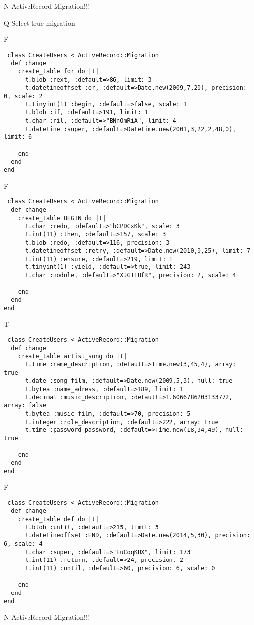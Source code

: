 N
ActiveRecord Migration!!!
  
Q
Select true migration

F
\begin{verbatim}
 class CreateUsers < ActiveRecord::Migration 
  def change 
    create_table for do |t| 
      t.blob :next, :default=>86, limit: 3
      t.datetimeoffset :or, :default=>Date.new(2009,7,20), precision: 0, scale: 2
      t.tinyint(1) :begin, :default=>false, scale: 1
      t.blob :if, :default=>191, limit: 1
      t.char :nil, :default=>"BNnOmRiA", limit: 4
      t.datetime :super, :default=>DateTime.new(2001,3,22,2,48,0), limit: 6
   
    end 
  end 
end
\end{verbatim}

F
\begin{verbatim}
 class CreateUsers < ActiveRecord::Migration 
  def change 
    create_table BEGIN do |t| 
      t.char :redo, :default=>"bCPDCxKk", scale: 3
      t.int(11) :then, :default=>157, scale: 3
      t.blob :redo, :default=>116, precision: 3
      t.datetimeoffset :retry, :default=>Date.new(2010,0,25), limit: 7
      t.int(11) :ensure, :default=>219, limit: 1
      t.tinyint(1) :yield, :default=>true, limit: 243
      t.char :module, :default=>"XJGTIUfR", precision: 2, scale: 4
   
    end 
  end 
end
\end{verbatim}

T
\begin{verbatim}
 class CreateUsers < ActiveRecord::Migration 
  def change 
    create_table artist_song do |t| 
      t.time :name_description, :default=>Time.new(3,45,4), array: true
      t.date :song_film, :default=>Date.new(2009,5,3), null: true
      t.bytea :name_adress, :default=>189, limit: 1
      t.decimal :music_description, :default=>1.6066786203133772, array: false
      t.bytea :music_film, :default=>70, precision: 5
      t.integer :role_description, :default=>222, array: true
      t.time :password_password, :default=>Time.new(18,34,49), null: true
   
    end 
  end 
end
\end{verbatim}

F
\begin{verbatim}
 class CreateUsers < ActiveRecord::Migration 
  def change 
    create_table def do |t| 
      t.blob :until, :default=>215, limit: 3
      t.datetimeoffset :END, :default=>Date.new(2014,5,30), precision: 6, scale: 4
      t.char :super, :default=>"EuCoqKBX", limit: 173
      t.int(11) :return, :default=>24, precision: 2
      t.int(11) :until, :default=>60, precision: 6, scale: 0
   
    end 
  end 
end
\end{verbatim}
N
ActiveRecord Migration!!!
  
